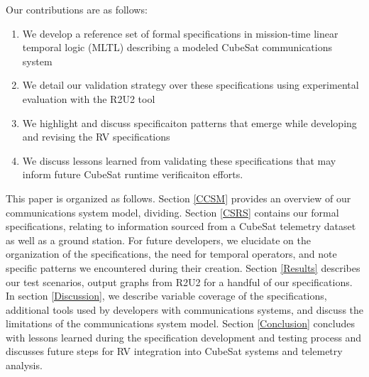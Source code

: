 \documentclass[conf]{new-aiaa}
\begin{document}
Our contributions are as follows:

\begin{enumerate}
  \item We develop a reference set of formal specifications in mission-time linear temporal logic (MLTL) describing a modeled CubeSat communications system
  \item We detail our validation strategy over these specifications using experimental evaluation with the R2U2 tool
  \item We highlight and discuss specificaiton patterns that emerge while developing and revising the RV specifications
  \item We discuss lessons learned from validating these specifications that may inform future CubeSat runtime verificaiton efforts.
\end{enumerate}

This paper is organized as follows. Section \ref{CCSM} provides an overview of our communications system model, dividing. Section \ref{CSRS} contains our formal specifications, relating to information sourced from a CubeSat telemetry dataset as well as a ground station. For future developers, we elucidate on the organization of the specifications, the need for temporal operators, and note specific patterns we encountered during their creation. Section \ref{Results} describes our test scenarios, output graphs from R2U2 for a handful of our specifications. In section \ref{Discussion}, we describe variable coverage of the specifications, additional tools used by developers with communications systems, and discuss the limitations of the communications system model. Section \ref{Conclusion} concludes with lessons learned during the specification development and testing process and discusses future steps for RV integration into CubeSat systems and telemetry analysis.



\end{document}
